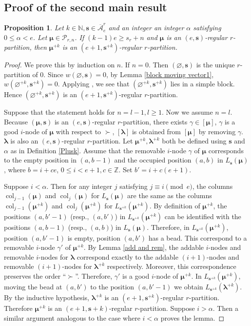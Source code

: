 \documentclass[a4paper,10pt]{amsart}
\theoremstyle{plain}
\newcommand{\bvarnothing}{{\boldsymbol \varnothing}}
\def\bs{{\boldsymbol{s}}}
\def\N{{\mathbb N}}
\def\PP{\mathscr{P}}
\def\blam{{\boldsymbol \lambda}}
\def\bmu{{\boldsymbol \mu}}
\DeclareMathOperator{\col}{col}
\theoremstyle{plain}
\newtheorem{prop}[theorem]{Proposition}
\numberwithin{equation}{section}
\begin{document}
\medskip
\subsection{Proof of the second main result}

\begin{prop}\label{PlusRegular2}
Let $k\in\N, \bs\in \overline{\mathcal A}^r_e$ and an integer an integer \(\alpha\) satisfying \(0\le \alpha<e\).  Let $\bmu\in\PP_{r,n}$. If $(k-1)e \ge s_r+ n$ and $\bmu$ is an $(e,\bs)$-regular $r$-partition, then $\bmu^{+k}$ is an $(e+1,\bs^{+k})$-regular $r$-partition.
\end{prop}
\begin{proof}
We prove this by induction on $n$. If $n=0$. Then $(\bvarnothing,\bs)$ is the unique $r$-partition of $0$. Since $w(\bvarnothing,\bs)=0$, by Lemma \ref{block moving vector1}, $w(\bvarnothing^{+k},\bs^{+k})=0$.  Applying \cite[Theorem 4.1]{F1}, we see that $(\bvarnothing^{+k},\bs^{+k})$ lies in a simple block. Hence $(\bvarnothing^{+k}, \bs^{+k})$ is an $(e+1,\mathbf{s}^{+k})$-regular $r$-partition.


Suppose that the statement holds for $n = l - 1, l \ge 1$. Now we assume $n=l$. Because $(\bmu, \bs)$ is an $(e,\bs)$-regular $r$-partition, there exists $\gamma\in [\bmu]$, $\gamma$ is a good $i$-node of $\bmu$ with respect to $\succ$, $[\blam]$ is obtained from $[\bmu]$ by removing $\gamma$. $\blam$ is also an $(e,\bs)$-regular $r$-partition. Let $\bmu^{+k},\blam^{+k}$ both be defined using $\bs$ and $\alpha$ as in Definition \ref{Plusk}.
Assume that the removable $i$-node $\gamma$ of $\bmu$ corresponds to the empty position in $(a, b-1)$ and the occupied position $(a, b)$ in $L_\bs (\bmu)$, where $b=i+ce$, $0\leq i<e+1, c\in\mathbb{Z}$. Set $b'=i+c(e+1)$.


Suppose $i<\alpha$. Then for any integer $j$ satisfying $j\equiv i\pmod e$, the columns $\col_{j-1}(\bmu)$ and $\col_j(\bmu)$ for $L_\bs(\bmu)$ are the same as the columns $\col_{j-1}(\bmu^{+k})$ and $\col_j(\bmu^{+k})$ for $L_{\bs^{+k}}(\bmu^{+k})$. By definition of $\bmu^{+k}$, the positions $(a, b'-1)$ (resp., $(a, b')$) in $L_{\bs^{+k}}(\bmu^{+k})$ can be identified with the positions $(a, b-1)$ (resp., $(a, b)$) in $L_\bs (\bmu)$. Therefore, in $L_{\bs^{+k}} (\bmu^{+k})$, position $(a, b'-1)$ is empty, position $(a, b')$ has a bead. This correspond to a removable $i$-node $\gamma'$ of $\bmu^{+k}$. By Lemma \ref{add and rem}, the addable $i$-nodes and removable $i$-nodes for $\blam$ correspond exactly to the addable $(i+1)$-nodes and removable $(i+1)$-nodes for $\blam^{+k}$ respectively. Moreover, this correspondence preserves the order ``$\succ$''.
Therefore, $\gamma'$ is  a good $i$-node of $\bmu^{+k}$.
In $L_{\bs^{+k}}(\boldsymbol{\mu}^{+k})$, moving the bead at $(a, b')$ to the position $(a, b'-1)$ we obtain $L_{\bs^{+k}}(\boldsymbol{\lambda}^{+k})$. By the inductive hypothesis, ${\blam}^{+k}$ is an $(e+1,\bs^{+k})$-regular $r$-partition. Therefore $\bmu^{+k}$ is an $(e+1,\bs+k)$-regular $r$-partition. Suppose $i>\alpha$. Then a similar argument analogous to the case where $i < \alpha$ proves the lemma.


\end{proof}
\end{document}
